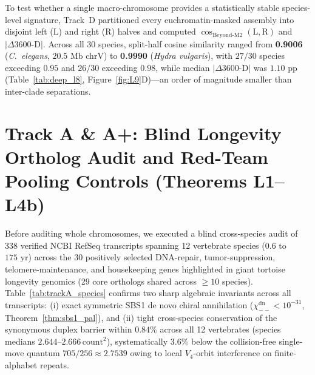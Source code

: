 \documentclass[11pt,a4paper]{article}
\renewcommand{\_}{\origunderscore\penalty200\relax}
\theoremstyle{remark}
\begin{document}
To test whether a single macro-chromosome provides a statistically stable species-level signature, Track~D partitioned every euchromatin-masked assembly into disjoint left ($\mathrm{L}$) and right ($\mathrm{R}$) halves and computed $\cos_{\mathrm{Beyond\text{-}M2}}(\mathrm{L},\mathrm{R})$ and $|\Delta \mathrm{3600\text{-}D}|$.
Across all 30 species, split-half cosine similarity ranged from \textbf{0.9006} (\textit{C.\ elegans}, $20.5\text{ Mb}$ chrV) to \textbf{0.9990} (\textit{Hydra vulgaris}), with $27/30$ species exceeding $0.95$ and $26/30$ exceeding $0.98$, while median $|\Delta \mathrm{3600\text{-}D}|$ was $1.10\text{ pp}$ (Table~\ref{tab:deep_l8}, Figure~\ref{fig:L9}D)---an order of magnitude smaller than inter-clade separations.

\section{Track A \& A+: Blind Longevity Ortholog Audit and Red-Team Pooling Controls (Theorems L1--L4b)}
Before auditing whole chromosomes, we executed a blind cross-species audit of 338 verified NCBI RefSeq transcripts spanning 12 vertebrate species ($0.6$ to $175\text{ yr}$) across the 30 positively selected DNA-repair, tumor-suppression, telomere-maintenance, and housekeeping genes highlighted in giant tortoise longevity genomics (29 core orthologs shared across $\ge 10$ species). Table~\ref{tab:trackA_species} confirms two sharp algebraic invariants across all transcripts: (i) exact symmetric SBS1 de novo chiral annihilation ($\chi_{--}^{\mathrm{dn}} < 10^{-31}$, Theorem~\ref{thm:sbs1_pal}), and (ii) tight cross-species conservation of the synonymous duplex barrier within $0.84\%$ across all 12 vertebrates (species medians $2.644\text{--}2.666\,\mathrm{count}^2$), systematically $3.6\%$ below the collision-free single-move quantum $705/256 \approx 2.7539$ owing to local $V_4$-orbit interference on finite-alphabet repeats.
\end{document}
